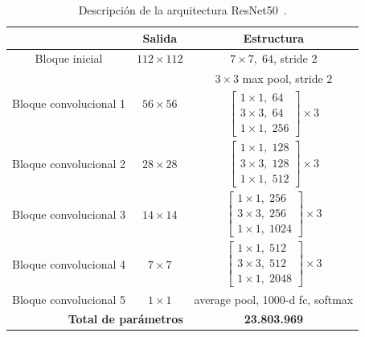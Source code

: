 \bgroup
\begin{table}[htp]
  \scriptsize
  \begin{center}
    \begin{tabular}[b]{|c|c|c|}
      \hline
      \rowcolor[HTML]{FFC702}
      \multicolumn{1}{|c|}{\textbf{Capa}} & \multicolumn{1}{c|}{\textbf{Salida}}  &
      \multicolumn{1}{c|}{\textbf{Estructura}} \\
      \hline
      Bloque inicial & $112\times112$ & $7\times7,\; 64$, stride 2 \\ 
      \hline 
      \multirow{2}{*}{Bloque convolucional 1} & \multirow{2}{*}{$56\times56$} & $3\times3$ max pool, stride 2 \\ 
      \cline{3-3}
                                              & & $\begin{bmatrix}1\times1,\; 64 \\ 3\times3,\; 64 \\ 1\times1,\; 256 \end{bmatrix}\times 3$ \\ 
      \hline
      Bloque convolucional 2 & $28\times28$ & $\begin{bmatrix}1\times1,\; 128 \\ 3\times3,\; 128 \\ 1\times1,\; 512 \end{bmatrix}  \times 3 $\\ 
      \hline
      Bloque convolucional 3 & $14\times14$ & $\begin{bmatrix}1\times1,\; 256 \\ 3\times3,\; 256 \\ 1\times1,\; 1024 \end{bmatrix} \times 3$ \\ 
      \hline
      Bloque convolucional 4 & $7\times7$   & $\begin{bmatrix}1\times1,\; 512 \\ 3\times3,\; 512 \\ 1\times1,\; 2048 \end{bmatrix}  \times 3 $\\ 
      \hline
      Bloque convolucional 5 & $1\times1$   & average pool, 1000-d fc, softmax\\ 
      \hline
      \multicolumn{2}{|r|}{\cellcolor[HTML]{FFC702}\textbf{Total de parámetros}} & \textbf{23.803.969}\\
      \hline 
      \end{tabular}
  \end{center}
  \caption[Descripción de la arquitectura de ResNet50.]{
    Descripción de la arquitectura ResNet50~\cite{ResNet}.
}
  \label{tab:ResNet50}
\end{table}
\egroup

